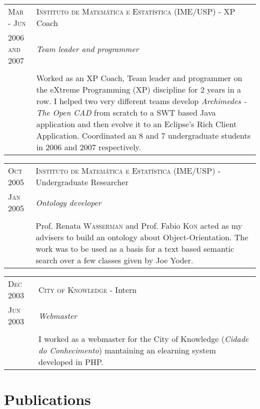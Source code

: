 \documentclass[letter,10pt]{article}
\begin{document}
\begin{tabular}{p{2.5cm}|p{13.5cm}}
  \textsc{Mar - Jun} & \textsc{Instituto de Matemática e Estatística
    (IME/USP)} - XP Coach\\
  \textsc{2006 and 2007}& \emph{Team leader and programmer}\\
  &\\
  &  Worked as an XP Coach, Team leader and programmer on the eXtreme
  Programming (XP) discipline for
  2 years in a row. I helped two very different teams develop
  \emph{Archimedes - The Open CAD} from scratch to a SWT based Java
  application and then evolve it to an Eclipse's Rich Client
  Application. Coordinated an 8 and 7 undergraduate students in
  2006 and 2007 respectively.
\end{tabular}

\begin{tabular}{p{2.5cm}|p{13.5cm}}
  \textsc{Oct 2005} & \textsc{Instituto de Matemática e Estatística
    (IME/USP)} - Undergraduate Researcher\\
  \textsc{Jan 2005}& \emph{Ontology developer}\\
  &\\
  & Prof. Renata \textsc{Wasserman} and Prof. Fabio \textsc{Kon} acted as my
  advisers to build an ontology about Object-Orientation. The work
  was to be used as a basis for a text based semantic search over a
  few classes given by Joe Yoder.
\end{tabular}

\begin{tabular}{p{2.5cm}|p{13.5cm}}
  \textsc{Dec 2003} & \textsc{City of Knowledge} - Intern\\
  \textsc{Jun 2003}& \emph{Webmaster}\\
  &\\
  & I worked as a webmaster for the City of Knowledge (\textit{Cidade
    do Conhecimento}) mantaining an elearning system developed in PHP.
\end{tabular}

\section{Publications}
\end{document}
